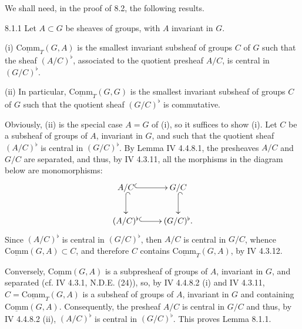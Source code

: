 We shall need, in the proof of 8.2, the following results.

\begin{lemma}{8.1.1}\label{VIB.8.1.1}
Let $A\subset G$ be sheaves of groups, with $A$ invariant in $G$.

(i) $\underline{\mathrm{Comm}}_T(G,A)$ is the smallest invariant subsheaf of groups $C$ of $G$ such that the sheaf $(A/C)^\flat$, associated to the quotient presheaf $A/C$, is central in $(G/C)^\flat$.

(ii) In particular, $\underline{\mathrm{Comm}}_T(G,G)$ is the smallest invariant subsheaf of groups $C$ of $G$ such that the quotient sheaf $(G/C)^\flat$ is commutative.
\end{lemma}
Obviously, (ii) is the special case $A=G$ of (i), so it suffices to show (i). Let $C$ be a subsheaf of groups of $A$, invariant in $G$, and such that the quotient sheaf $(A/C)^\flat$ is central in $(G/C)^\flat$. By Lemma IV 4.4.8.1, the presheaves $A/C$ and $G/C$ are separated, and thus, by IV 4.3.11, all the morphisms in the diagram below are monomorphisms:
\[
\xymatrix{A/C\ar@{^{(}->}[r]\ar@{^{(}->}[d] & G/C\ar@{^{(}->}[d]\\(A/C)^\flat\ar@{^{(}->}[r] & (G/C)^\flat.}
\]
Since $(A/C)^\flat$ is central in $(G/C)^\flat$, then $A/C$ is central in $G/C$, whence $\underline{\mathrm{Comm}}(G,A)\subset C$, and therefore $C$ contains $\underline{\mathrm{Comm}}_T(G,A)$, by IV 4.3.12.

Conversely, $\underline{\mathrm{Comm}}(G,A)$ is a subpresheaf of groups of $A$, invariant in $G$, and separated (cf. IV 4.3.1, N.D.E. (24)), so, by IV 4.4.8.2 (i) and IV 4.3.11, $C=\underline{\mathrm{Comm}}_T(G,A)$ is a subsheaf of groups of $A$, invariant in $G$ and containing $\underline{\mathrm{Comm}}(G,A)$. Consequently, the presheaf $A/C$ is central in $G/C$ and thus, by IV 4.4.8.2 (ii), $(A/C)^\flat$ is central in $(G/C)^\flat$. This proves Lemma 8.1.1.

